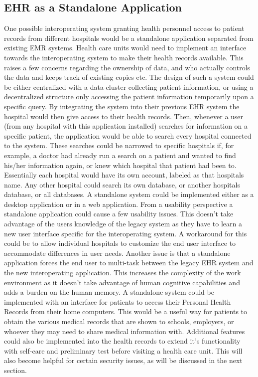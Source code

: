 \documentclass[14pt]{article}
\begin{document}
\subsection{EHR as a Standalone Application}
One possible interoperating system granting health personnel access to patient records from different hospitals would be a standalone application separated from existing EMR systems. Health care units would need to implement an interface towards the interoperating system to make their health records available. 
This raises a few concerns regarding the ownership of data, and who actually controls the data and keeps track of existing copies etc. The design of such a system could be either centralized with a data-cluster collecting patient information, or using a decentralized structure only accessing the patient information temporarily upon a specific query. By integrating the system into their previous EHR system the hospital would then give access to their health records. Then, whenever a user (from any hospital with this application installed) searches for information on a specific patient, the application would be able to search every hospital connected to the system. These searches could be narrowed to specific hospitals if, for example, a doctor had already run a search on a patient and wanted to find his/her information again, or knew which hospital that patient had been to. Essentially each hospital would have its own account, labeled as that hospitals name. Any other hospital could search its own database, or another hospitals database, or all databases.
A standalone system could be implemented either as a desktop application or in a web application. From a usability perspective a standalone application could cause a few usability issues. This doesn’t take advantage of the users knowledge of the legacy system as they have to learn a new user interface specific for the interoperating system. A workaround for this could be to allow individual hospitals to customize the end user interface to accommodate differences in user needs.
Another issue is that a standalone application forces the end user to multi-task between the legacy EHR system and the new interoperating application. This increases the complexity of the work environment as it doesn’t take advantage of human cognitive capabilities and adds a burden on the human memory.
A standalone system could be implemented with an interface for patients to access their Personal Health Records from their home computers. This would be a useful way for patients to obtain the various medical records that are shown to schools, employers, or whoever they may need to share medical information with. Additional features could also be implemented into the health records to extend it’s functionality with self-care and preliminary test before visiting a health care unit. This will also become helpful for certain security issues, as will be discussed in the next section.
\end{document}
